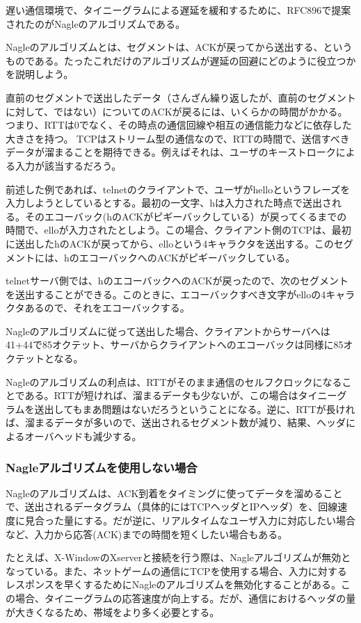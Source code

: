 遅い通信環境で、タイニーグラムによる遅延を緩和するために、RFC896で提案されたのがNagleのアルゴリズムである。

Nagleのアルゴリズムとは、セグメントは、ACKが戻ってから送出する、というものである。たったこれだけのアルゴリズムが遅延の回避にどのように役立つかを説明しよう。

直前のセグメントで送出したデータ（さんざん繰り返したが、直前のセグメントに対して、ではない）についてのACKが戻るには、いくらかの時間がかかる。つまり、RTTは0でなく、その時点の通信回線や相互の通信能力などに依存した大きさを持つ。 TCPはストリーム型の通信なので、RTTの時間で、送信すべきデータが溜まることを期待できる。例えばそれは、ユーザのキーストロークによる入力が該当するだろう。

前述した例であれば、telnetのクライアントで、ユーザがhelloというフレーズを入力しようとしているとする。最初の一文字、hは入力された時点で送出される。そのエコーバック(hのACKがピギーバックしている）が戻ってくるまでの時間で、elloが入力されたとしよう。この場合、クライアント側のTCPは、最初に送出したhのACKが戻ってから、elloという4キャラクタを送出する。このセグメントには、hのエコーバックへのACKがピギーバックしている。

telnetサーバ側では、hのエコーバックへのACKが戻ったので、次のセグメントを送出することができる。このときに、エコーバックすべき文字がelloの4キャラクタあるので、それをエコーバックする。

Nagleのアルゴリズムに従って送出した場合、クライアントからサーバへは41+44で85オクテット、サーバからクライアントへのエコーバックは同様に85オクテットとなる。

Nagleのアルゴリズムの利点は、RTTがそのまま通信のセルフクロックになることである。RTTが短ければ、溜まるデータも少ないが、この場合はタイニーグラムを送出してもまあ問題はないだろうということになる。逆に、RTTが長ければ、溜まるデータが多いので、送出されるセグメント数が減り、結果、ヘッダによるオーバヘッドも減少する。

\subsubsection{Nagleアルゴリズムを使用しない場合}

Nagleのアルゴリズムは、ACK到着をタイミングに使ってデータを溜めることで、送出されるデータグラム（具体的にはTCPヘッダとIPヘッダ）を、回線速度に見合った量にする。だが逆に、リアルタイムなユーザ入力に対応したい場合など、入力から応答(ACK)までの時間を短くしたい場合もある。

たとえば、X-WindowのXserverと接続を行う際は、Nagleアルゴリズムが無効となっている。また、ネットゲームの通信にTCPを使用する場合、入力に対するレスポンスを早くするためにNagleのアルゴリズムを無効化することがある。この場合、タイニーグラムの応答速度が向上する。だが、通信におけるヘッダの量が大きくなるため、帯域をより多く必要とする。

